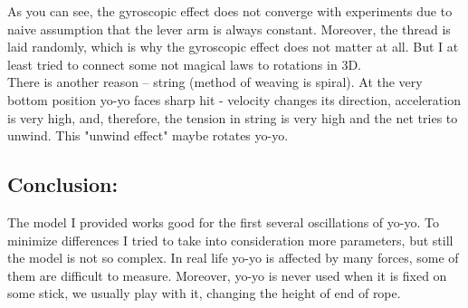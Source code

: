 \documentclass[a4paper,11pt,oneside,article]{memoir}
\begin{document}
As you can see, the gyroscopic effect does not converge with experiments due to naive assumption that the lever arm is always constant. Moreover, the thread is laid randomly, which is why the gyroscopic effect does not matter at all. But I at least tried to connect some not magical laws to rotations in 3D.\\
There is another reason – string (method of weaving is spiral). At the very bottom position yo-yo faces sharp hit - velocity changes its direction, acceleration is very high, and, therefore, the tension in string is very high and the net tries to unwind. This "unwind effect" maybe rotates yo-yo. 
\subsection{Conclusion:}
The model I provided works good for the first several oscillations of yo-yo. To minimize differences I tried to take into consideration more parameters, but still the model is not so complex. In real life yo-yo is affected by many forces, some of them are difficult to measure. Moreover, yo-yo is never used when it is fixed on some stick, we usually play with it, changing the height of end of rope. 
\end{document}

